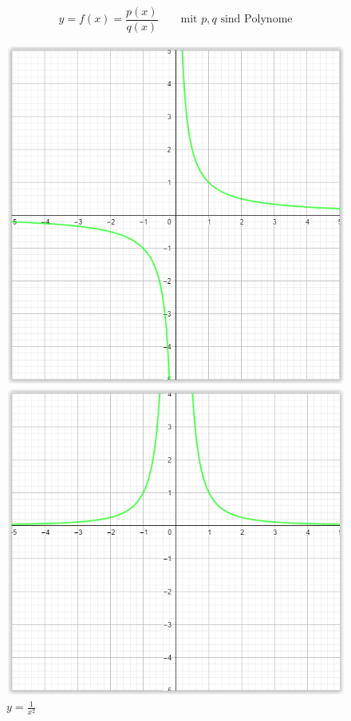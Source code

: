 		\vspace{-0.5cm}
		\newpage
		\begin{equation}
		  y = f(x) = \frac{p(x)}{q(x)} \qquad \text{mit } p,q \text{ sind Polynome}
		\end{equation}
		\begin{figure}[H] 
		\centering
		\begin{minipage}{.5\textwidth}
		  \centering
		  \includegraphics[width=0.6\linewidth]{./img/funktionen_pole_1.png}
		  \caption{$y = \frac{1}{x}$}
		  \label{fig:funkt_pole_1}
		\end{minipage}%
		\begin{minipage}{.5\textwidth}
		  \centering
		  \includegraphics[width=0.65\linewidth]{./img/funktionen_pole_2.png}
		  \caption{$y = \frac{1}{x^2}$}
		  \label{fig:funkt_pole_2}
		\end{minipage}
		\end{figure}
		
